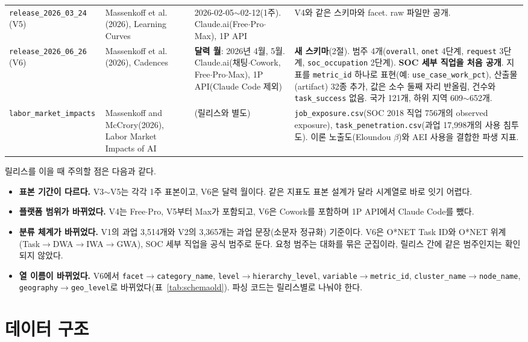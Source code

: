 \documentclass[11pt]{article}
\begin{document}
{\begin{longtable}{L{2.0cm}L{3.0cm}L{3.2cm}L{8.6cm}}
\texttt{release\_2026\_03\_24} (V5) & Massenkoff et al.(2026), Learning Curves & 2026-02-05$\sim$02-12(1주). Claude.ai(Free$\cdot$Pro$\cdot$Max), 1P API & V4와 같은 스키마와 facet. raw 파일만 공개. \\
\texttt{release\_2026\_06\_26} (V6) & Massenkoff et al.(2026), Cadences & \textbf{달력 월}: 2026년 4월, 5월. Claude.ai(채팅$\cdot$Cowork, Free$\cdot$Pro$\cdot$Max), 1P API(Claude Code 제외) & \textbf{새 스키마}(2절). 범주 4개(\texttt{overall}, \texttt{onet} 4단계, \texttt{request} 3단계, \texttt{soc\_occupation} 2단계). \textbf{SOC 세부 직업을 처음 공개}. 지표를 \texttt{metric\_id} 하나로 표현(예: \texttt{use\_case\_work\_pct}), 산출물(artifact) 32종 추가, 값은 소수 둘째 자리 반올림, 건수와 \texttt{task\_success} 없음. 국가 121개, 하위 지역 609$\sim$652개. \\
\texttt{labor\_market\_impacts} & Massenkoff and McCrory(2026), Labor Market Impacts of AI & (릴리스와 별도) & \texttt{job\_exposure.csv}(SOC 2018 직업 756개의 observed exposure), \texttt{task\_penetration.csv}(과업 17,998개의 사용 침투도). 이론 노출도(Eloundou $\beta$)와 AEI 사용을 결합한 파생 지표. \\
\bottomrule
\end{longtable}
}

릴리스를 이을 때 주의할 점은 다음과 같다.
\begin{itemize}[leftmargin=*]
  \item \textbf{표본 기간이 다르다.} V3$\sim$V5는 각각 1주 표본이고, V6은 달력 월이다. 같은 지표도 표본 설계가 달라 시계열로 바로 잇기 어렵다.
  \item \textbf{플랫폼 범위가 바뀌었다.} V4는 Free$\cdot$Pro, V5부터 Max가 포함되고, V6은 Cowork를 포함하며 1P API에서 Claude Code를 뺐다.
  \item \textbf{분류 체계가 바뀌었다.} V1의 과업 3,514개와 V2의 3,365개는 과업 문장(소문자 정규화) 기준이다. V6은 O*NET Task ID와 O*NET 위계(Task$\to$DWA$\to$IWA$\to$GWA), SOC 세부 직업을 공식 범주로 둔다. 요청 범주는 대화를 묶은 군집이라, 릴리스 간에 같은 범주인지는 확인되지 않았다.
  \item \textbf{열 이름이 바뀌었다.} V6에서 \texttt{facet}$\to$\texttt{category\_name}, \texttt{level}$\to$\texttt{hierarchy\_level}, \texttt{variable}$\to$\texttt{metric\_id}, \texttt{cluster\_name}$\to$\texttt{node\_name}, \texttt{geography}$\to$\texttt{geo\_level}로 바뀌었다(표~\ref{tab:schemaold}). 파싱 코드는 릴리스별로 나눠야 한다.
\end{itemize}

\section{데이터 구조}
\end{document}

